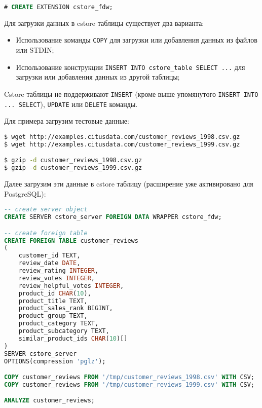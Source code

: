 \begin{lstlisting}[language=SQL,label=lst:cstore2,caption=Cstore\_fdw]
# CREATE EXTENSION cstore_fdw;
\end{lstlisting}

Для загрузки данных в cstore таблицы существует два варианта:

\begin{itemize}
  \item Использование команды \lstinline!COPY! для загрузки или добавления данных из файлов или STDIN;
  \item Использование конструкции \lstinline!INSERT INTO cstore_table SELECT ...! для загрузки или добавления данных из другой таблицы;
\end{itemize}

Cstore таблицы не поддерживают \lstinline!INSERT! (кроме выше упомянутого \lstinline!INSERT INTO ... SELECT!), \lstinline!UPDATE! или \lstinline!DELETE! команды.

Для примера загрузим тестовые данные:

\begin{lstlisting}[language=Bash,label=lst:cstore3,caption=Cstore\_fdw]
$ wget http://examples.citusdata.com/customer_reviews_1998.csv.gz
$ wget http://examples.citusdata.com/customer_reviews_1999.csv.gz

$ gzip -d customer_reviews_1998.csv.gz
$ gzip -d customer_reviews_1999.csv.gz
\end{lstlisting}

Далее загрузим эти данные в cstore таблицу (расширение уже активировано для PostgreSQL):

\begin{lstlisting}[language=SQL,label=lst:cstore4,caption=Cstore таблицы]
-- create server object
CREATE SERVER cstore_server FOREIGN DATA WRAPPER cstore_fdw;

-- create foreign table
CREATE FOREIGN TABLE customer_reviews
(
    customer_id TEXT,
    review_date DATE,
    review_rating INTEGER,
    review_votes INTEGER,
    review_helpful_votes INTEGER,
    product_id CHAR(10),
    product_title TEXT,
    product_sales_rank BIGINT,
    product_group TEXT,
    product_category TEXT,
    product_subcategory TEXT,
    similar_product_ids CHAR(10)[]
)
SERVER cstore_server
OPTIONS(compression 'pglz');

COPY customer_reviews FROM '/tmp/customer_reviews_1998.csv' WITH CSV;
COPY customer_reviews FROM '/tmp/customer_reviews_1999.csv' WITH CSV;

ANALYZE customer_reviews;
\end{lstlisting}

